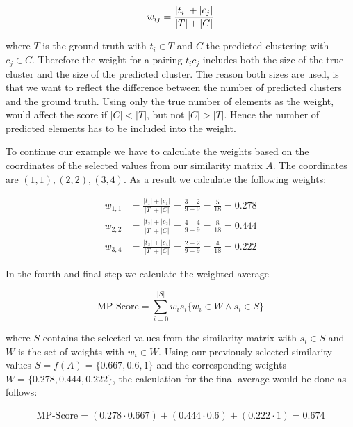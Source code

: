 \begin{equation}
    \label{equ:weight}
        w_{ij} = \frac{|t_i| + |c_j|}{|T|+|C|} \\
\end{equation}

where $T$ is the ground truth with $t_i \in T$ and $C$ the predicted clustering with  $c_j \in C$.
Therefore the weight for a pairing $t_ic_j$ includes both the size of the true cluster and the size of the predicted cluster.
The reason both sizes are used, is that we want to reflect the difference between the number of predicted clusters and the ground truth.
Using only the true number of elements as the weight, would affect the score if $|C| < |T|$, but not $|C| > |T|$.
Hence the number of predicted elements has to be included into the weight.

To continue our example we have to calculate the weights based on the coordinates of the selected values from our similarity matrix $A$.
The coordinates are $(1,1), (2,2), (3,4)$.
As a result we calculate the following weights:

\begin{align*}
    w_{1,1} &= \frac{|t_1| + |c_1|}{|T|+|C|} = \frac{3 + 2}{9 + 9} = \frac{5}{18} = 0.278 \\
    w_{2,2} &= \frac{|t_2| + |c_2|}{|T|+|C|} = \frac{4 + 4}{9 + 9} = \frac{8}{18} = 0.444 \\
    w_{3,4} &= \frac{|t_3| + |c_4|}{|T|+|C|} = \frac{2 + 2}{9 + 9} = \frac{4}{18} = 0.222
\end{align*}

In the fourth and final step we calculate the weighted average

\begin{equation}
    \label{equ:weighted_average}
        \text{MP-Score} = \sum_{i=0}^{|S|} w_is_i \{w_i \in W \wedge s_i \in S\}
\end{equation}

where $S$ contains the selected values from the similarity matrix with $s_{i} \in S$ and $W$ is the set of weights with $w_i \in W$.
Using our previously selected similarity values $S = f(A) = \{0.667, 0.6, 1\}$
and the corresponding weights $W = \{0.278, 0.444, 0.222\}$,
the calculation for the final average would be done as follows:

\begin{align*}
    \text{MP-Score} = (0.278 \cdot 0.667) + (0.444 \cdot 0.6) + (0.222 \cdot 1) = \mathbf{0.674}
\end{align*}

